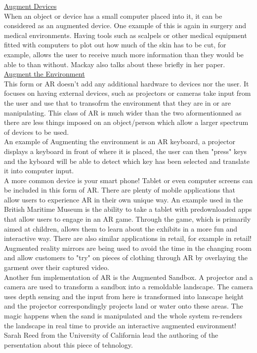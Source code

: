 \documentclass[11pt]{report}
\begin{document}
\underline{Augment Devices} \\
When an object or device has a small computer placed into it, it can be 
considered as an augmented device. One example of this is again in 
surgery and medical environments. Having tools such as scalpels or other 
medical equipment fitted with computers to plot out how much of the skin has
to be cut, for example, allows the user to receive much more information
than they would be able to than without. Mackay also talks about these briefly 
in her paper.\\

\underline{Augment the Environment} \\
This form or AR doesn't add any additional hardware to devices nor the user.
It focuses on having external devices, such as projectors or cameras take 
input from the user and use that to transofrm the environment that they are in
or are manipulating. This class of AR is much wider than the two 
aformentionned as there are less things imposed on an object/person which 
allow a larger spectrum of devices to be used. \\

An example of Augmenting the environment is an AR keyboard, a projector displays
a keyboard in front of where it is placed, the user can then "press" keys and
the kyboard will be able to detect which key has been selected and translate it 
into computer input. \\

A more common device is your smart phone! Tablet or even computer screens can
be included in this form of AR. There are plenty of mobile applications that
allow users to experience AR in their own unique way. An example used in the
British Maritime Museum is the ability to take a tablet with predownloaded apps
that allow users to engage in an AR game. Through the game, which is primarily
aimed at children, allows them to learn about the exhibits in a more fun and
interactive way. There are also similar applications in retail, for example
in retail! Augmented reality mirrors are being used to avoid the time in the
changing room and allow customers to "try" on pieces of clothing through
AR by overlaying the garment over their captured video. \\

Another fun implementation of AR is the Augmented Sandbox. A projector and
a camera are used to transform a sandbox into a remoldable landscape. The camera
uses depth sensing and the input from here is transformed into lanscape height
and the projector correspondingly projects land or water onto these areas. The
magic happens when the sand is manipulated and the whole system re-renders the
landscape in real time to provide an interactive augmented environment! Sarah
Reed from the University of California lead the authoring of the persentation
about this piece of tehnology\cite{Reed14}.\\
\end{document}

